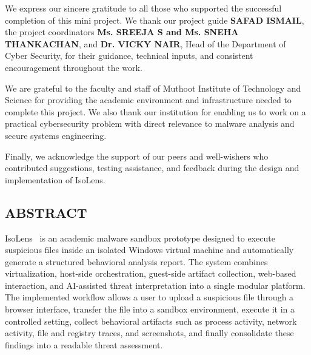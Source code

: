 \documentclass[a4paper,12pt,oneside]{report}
\begin{document}
\noindent
We express our sincere gratitude to all those who supported the successful completion of this mini project. We thank our project guide \textbf{SAFAD ISMAIL}, the project coordinators \textbf{Ms. SREEJA S and Ms. SNEHA THANKACHAN}, and \textbf{Dr. VICKY NAIR}, Head of the Department of Cyber Security, for their guidance, technical inputs, and consistent encouragement throughout the work.

\par

\par

We are grateful to the faculty and staff of Muthoot Institute of Technology and Science for providing the academic environment and infrastructure needed to complete this project. We also thank our institution for enabling us to work on a practical cybersecurity problem with direct relevance to malware analysis and secure systems engineering.

\par

\par

Finally, we acknowledge the support of our peers and well-wishers who contributed suggestions, testing assistance, and feedback during the design and implementation of IsoLens.

\newpage
{}
\setcounter{page}{2}
\thispagestyle{plain}
\begin{center}
\section*{ABSTRACT}
\end{center}
\par

IsoLens~\cite{isolens} is an academic malware sandbox prototype designed to execute suspicious files inside an isolated Windows virtual machine and automatically generate a structured behavioral analysis report. The system combines virtualization, host-side orchestration, guest-side artifact collection, web-based interaction, and AI-assisted threat interpretation into a single modular platform. The implemented workflow allows a user to upload a suspicious file through a browser interface, transfer the file into a sandbox environment, execute it in a controlled setting, collect behavioral artifacts such as process activity, network activity, file and registry traces, and screenshots, and finally consolidate these findings into a readable threat assessment.
\end{document}
